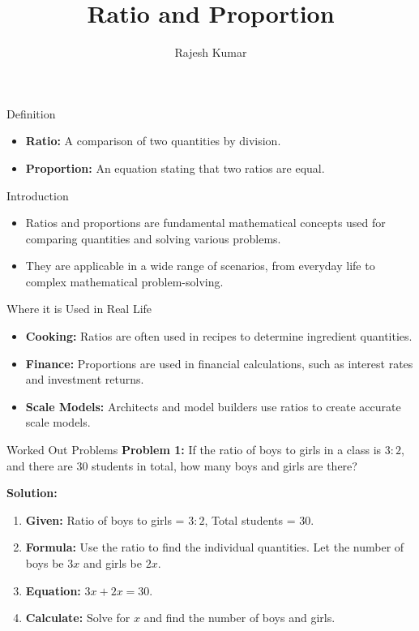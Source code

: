 \title{Ratio and Proportion}
\author{Rajesh Kumar}
\date{}

\begin{frame}
  \titlepage
\end{frame}

\begin{frame}{Definition}
  \begin{itemize}
    \item \textbf{Ratio:} A comparison of two quantities by division.
    \item \textbf{Proportion:} An equation stating that two ratios are equal.
  \end{itemize}
\end{frame}

\begin{frame}{Introduction}
  \begin{itemize}
    \item Ratios and proportions are fundamental mathematical concepts used for comparing quantities and solving various problems.
    \item They are applicable in a wide range of scenarios, from everyday life to complex mathematical problem-solving.
  \end{itemize}
\end{frame}

\begin{frame}{Where it is Used in Real Life}
  \begin{itemize}
    \item \textbf{Cooking:} Ratios are often used in recipes to determine ingredient quantities.
    \item \textbf{Finance:} Proportions are used in financial calculations, such as interest rates and investment returns.
    \item \textbf{Scale Models:} Architects and model builders use ratios to create accurate scale models.
  \end{itemize}
\end{frame}

\begin{frame}{Worked Out Problems}
  \textbf{Problem 1:} If the ratio of boys to girls in a class is $3:2$, and there are 30 students in total, how many boys and girls are there?

  \textbf{Solution:}
  \begin{enumerate}
    \item \textbf{Given:} Ratio of boys to girls = $3:2$, Total students = $30$.
    \item \textbf{Formula:} Use the ratio to find the individual quantities. Let the number of boys be $3x$ and girls be $2x$.
    \item \textbf{Equation:} $3x + 2x = 30$.
    \item \textbf{Calculate:} Solve for $x$ and find the number of boys and girls.
  \end{enumerate}
\end{frame}

